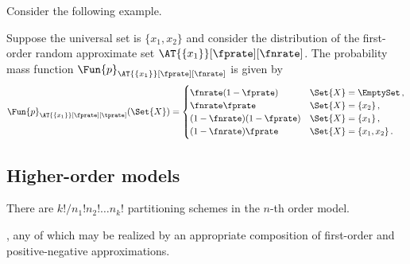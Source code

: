 \documentclass[ ../main.tex]{subfiles}
\begin{document}


Consider the following example.
\begin{example}
	Suppose the universal set is $\{ x_1,x_2 \}$ and consider the distribution of the first-order random approximate set $\AT{\{x_1\}}[\fprate][\fnrate]$.
	The probability mass function $\Fun{p}_{\AT{\{x_1\}}[\fprate][\fnrate]}$ is given by
	\begin{equation}
	\Fun{p}_{\AT{\{x_1\}}[\fprate][\tprate]}(\Set{X}) =
	\begin{cases} 
	\fnrate (1-\fprate) & \Set{X} = \EmptySet\,,\\
	\fnrate \fprate     & \Set{X} = \{x_2\}\,,\\
	(1-\fnrate)(1-\fprate)     & \Set{X} = \{x_1\}\,,\\
	(1-\fnrate)\fprate         & \Set{X} = \{x_1,x_2\}\,.
	\end{cases}
	\end{equation}
\end{example}


\subsection{Higher-order models}
There are $k! / n_1! n_2! \ldots n_k!$ partitioning schemes in the $n$-th order model.



, any of which may be realized by an appropriate composition of first-order and positive-negative approximations.
\end{document}
